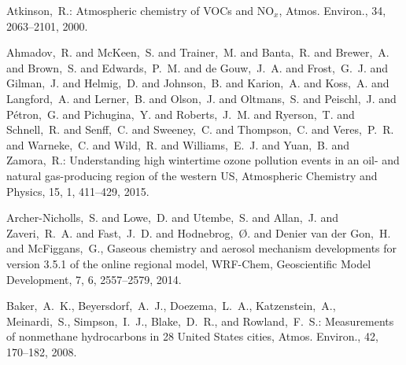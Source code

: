 \documentclass[acpd, online, hvmath]{copernicus}
\begin{document}
\begin{thebibliography}{34}

 Atkinson,~R.: {Atmospheric
chemistry of VOCs and NO$_{x}$}, Atmos. Environ., 34, 2063--2101, 2000.


     Ahmadov,~R. and McKeen,~S. and Trainer,~M. and Banta,~R. and Brewer,~A. and Brown,~S. and Edwards,~P.~M. and de Gouw,~J.~A. and Frost,~G.~J. and Gilman,~J. and Helmig,~D. and Johnson,~B. and Karion,~A. and Koss,~A. and Langford,~A. and Lerner,~B. and Olson,~J. and Oltmans,~S. and Peischl,~J. and P\'etron,~G. and Pichugina,~Y. and Roberts,~J.~M. and Ryerson,~T. and Schnell,~R. and Senff,~C. and Sweeney,~C. and Thompson,~C. and Veres,~P.~R. and Warneke,~C. and Wild,~R. and Williams,~E.~J. and Yuan,~B. and Zamora,~R.: Understanding high wintertime ozone pollution events in an oil- and natural gas-producing region of the western US, Atmospheric Chemistry and Physics, 15, 1, 411--429, 2015.


     Archer-Nicholls,~S. and Lowe,~D. and Utembe,~S. and Allan,~J. and Zaveri,~R.~A. and Fast,~J.~D. and Hodnebrog,~{\O}. and Denier van der Gon,~H. and McFiggans,~G., Gaseous chemistry and aerosol mechanism developments for version 3.5.1 of the online regional model, WRF-Chem, Geoscientific Model Development, 7, 6, 2557--2579, 2014.


 Baker,~A.~K.,
  Beyersdorf,~A.~J., Doezema,~L.~A., Katzenstein,~A., Meinardi,~S.,
  Simpson,~I.~J., Blake,~D.~R., and Rowland,~F.~S.: {Measurements of
    nonmethane hydrocarbons in 28 United States cities},
  Atmos. Environ., 42, 170--182, 2008.



\end{thebibliography}
\end{document}
